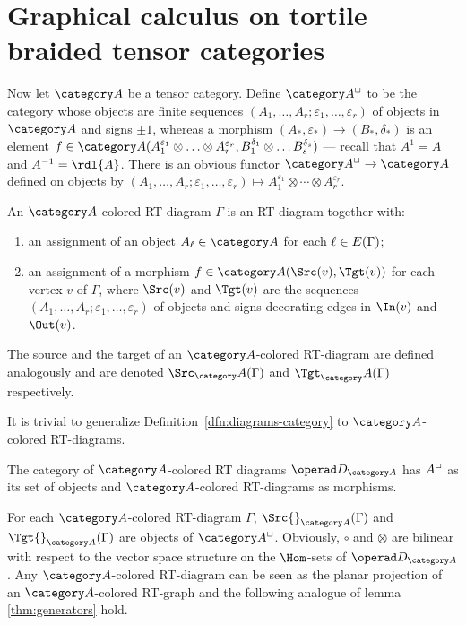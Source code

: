\section{Graphical calculus on tortile braided tensor categories}
\label{sec:rt-gc}
Now let $\A$ be a tensor category. Define $\freemsc{\A}$ to be the
category whose objects are finite sequences $(A_1, \ldots, A_r; \varepsilon_1, \ldots,
\varepsilon_r)$ of objects in $\A$ and signs $\pm1$, whereas a morphism $(A_*,
\varepsilon_*) \to (B_*, \delta_*)$ is an element $f \in \A(A_1^{\varepsilon_1} \otimes \ldots \otimes
A_r^{\varepsilon_r}, B_1^{\delta_1} \otimes \ldots B_s^{\delta_s})$ --- recall that $A^1 = A$
and $A^{-1} = \rdl{A}$.  There is an obvious functor $\freemsc{\A} \to
\A$ defined on objects by $(A_1, \ldots, A_r; \varepsilon_1, \ldots, \varepsilon_r) \mapsto
A_1^{\varepsilon_1} \otimes \cdots \otimes A_r^{\varepsilon_r}$.
\begin{definition}
  An $\A$-colored RT-diagram $\Gamma$ is an RT-diagram together with:
  \begin{enumerate}
  \item an assignment of an object $A_\ell \in \A$ for each
    $\ell\in E(\Gamma)$;
  \item an assignment of a morphism $f\in\A(\Src(v),\Tgt(v))$ for each
    vertex $v$ of $\Gamma$, where $\Src(v)$ and $\Tgt(v)$ are the
    sequences $(A_1, \ldots, A_r;\varepsilon_1, \ldots, \varepsilon_r)$ of objects and signs
    decorating edges in $\In(v)$ and $\Out(v)$.
  \end{enumerate}
  The source and the target of an $\A$-colored RT-diagram are defined
  analogously and are denoted $\Src_\A(\Gamma)$ and $\Tgt_\A(\Gamma)$ respectively.
\end{definition}
It is trivial to generalize Definition~\ref{dfn:diagrams-category} to
$\A$-colored RT-diagrams.
\begin{definition}
  The category of $\A$-colored RT diagrams $\RTD[\A]$  has
  $A^{\Box}$ as its set of objects and $\A$-colored RT-diagrams as
  morphisms. 
\end{definition}
For each $\A$-colored RT-diagram $\Gamma$, $\Src{}_{\A}(\Gamma)$ and
$\Tgt{}_{\A}(\Gamma)$ are objects of $\freemsc{\A}$.  Obviously, $\circ$ and
$\otimes$ are bilinear with respect to the vector space structure on the
$\Hom$-sets of $\RTD[\A]$. Any $\A$-colored RT-diagram can be seen as
the planar projection of an $\A$-colored RT-graph and the following
analogue of lemma \ref{thm:generators} hold.
